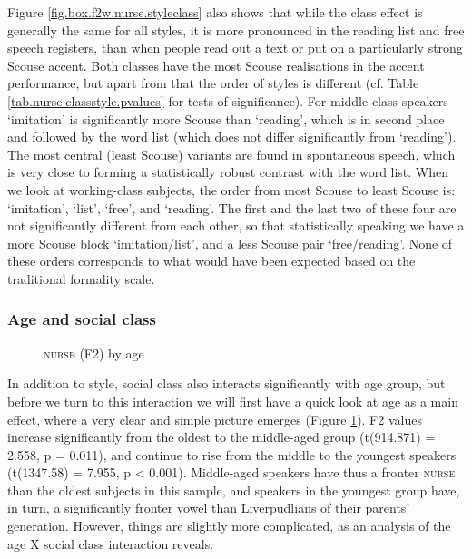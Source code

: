 Figure \ref{fig.box.f2w.nurse.styleclass} also shows that while the class effect is generally the same for all styles, it is more pronounced in the reading list and free speech registers, than when people read out a text or put on a particularly strong Scouse accent.
Both classes have the most Scouse realisations in the accent performance, but apart from that the order of styles is different (cf. Table \ref{tab.nurse.classstyle.pvalues} for tests of significance).
For middle-class speakers `imitation' is significantly more Scouse than `reading', which is in second place and followed by the word list (which does not differ significantly from `reading').
The most central (least Scouse) variants are found in spontaneous speech, which is very close to forming a statistically robust contrast with the word list.
When we look at working-class subjects, the order from most Scouse to least Scouse is: `imitation', `list', `free', and `reading'.
The first and the last two of these four are not significantly different from each other, so that statistically speaking we have a more Scouse block `imitation/list', and a less Scouse pair `free/reading'.
None of these orders corresponds to what would have been expected based on the traditional formality scale.

\subsubsection{Age and social class}
\label{sec.prod.res.vow.nurse.f2.styleage}

\begin{figure}[h!]
	\centering
		\resizebox{0.5\linewidth}{!}{} 
	\caption{\textsc{nurse} (F2) by age}
	\label{fig.box.f2.nurse.tot}
\end{figure}

In addition to style, social class also interacts significantly with age group, but before we turn to this interaction we will first have a quick look at age as a main effect, where a very clear and simple picture emerges (Figure \ref{fig.box.f2.nurse.tot}).
F2 values increase significantly from the oldest to the middle-aged group (t(914.871) = 2.558, p = 0.011), and continue to rise from the middle to the youngest speakers (t(1347.58) = 7.955, p < 0.001).
Middle-aged speakers have thus a fronter \textsc{nurse} than the oldest subjects in this sample, and speakers in the youngest group have, in turn, a significantly fronter vowel than Liverpudlians of their parents' generation.
However, things are slightly more complicated, as an analysis of the age X social class interaction reveals.

